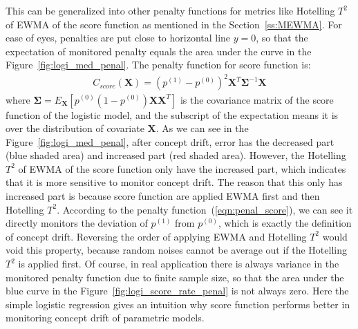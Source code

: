 \documentclass[twoside,11pt]{article}
\begin{document}
This can be generalized into other penalty functions for metrics like Hotelling $T^2$ of EWMA of the score function as mentioned in the Section~\ref{ss:MEWMA}. For ease of eyes, penalties are put close to horizontal line $y=0$, so that the expectation of monitored penalty equals the area under the curve in the Figure~\ref{fig:logi_med_penal}. 
The penalty function for score function is:
\begin{align}
C _{score}(\bm {X}) = (p ^{(1)} - p ^{(0)})^2 \bm {X}^T\bm { \Sigma}^{-1}\bm {X}
\label{eqn:penal_score}
\end{align}
where $\bm { \Sigma} = E _{\bm {X}}[p ^{(0)}(1-p ^{(0)})\bm {X}\bm {X}^T]$ is the covariance matrix of the score function of the logistic model, and the subscript of the expectation means it is over the distribution of covariate $\bm {X}$. As we can see in the Figure~\ref{fig:logi_med_penal}, after concept drift, error has the decreased part (blue shaded area) and increased part (red shaded area). However, the Hotelling $T^2$ of EWMA of the score function only have the increased part, which indicates that it is more sensitive to monitor concept drift. The reason that this only has increased part is because score function are applied EWMA first and then Hotelling $T^2$. According to the penalty function~(\ref{eqn:penal_score}), we can see it directly monitors the deviation of $p ^{(1)}$ from $p ^{(0)}$, which is exactly the definition of concept drift. Reversing the order of applying EWMA and Hotelling $T^2$ would void this property, because random noises cannot be average out if the Hotelling $T^2$ is applied first. Of course, in real application there is always variance in the monitored penalty function due to finite sample size, so that the area under the blue curve in the Figure~\ref{fig:logi_score_rate_penal} is not always zero. Here the simple logistic regression gives an intuition why score function performs better in monitoring concept drift of parametric models. 
\end{document}
